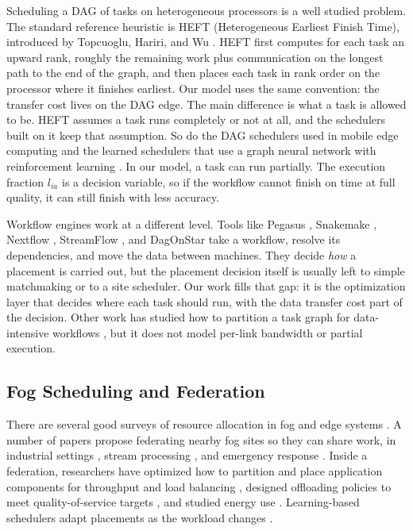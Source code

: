 \documentclass[conference]{IEEEtran}
\begin{document}
Scheduling a DAG of tasks on heterogeneous processors is a well studied problem. The standard reference heuristic is HEFT (Heterogeneous Earliest Finish Time), introduced by Topcuoglu, Hariri, and Wu \cite{topcuoglu2002heft}. HEFT first computes for each task an upward rank, roughly the remaining work plus communication on the longest path to the end of the graph, and then places each task in rank order on the processor where it finishes earliest. Our model uses the same convention: the transfer cost lives on the DAG edge. The main difference is what a task is allowed to be. HEFT assumes a task runs completely or not at all, and the schedulers built on it keep that assumption. So do the DAG schedulers used in mobile edge computing \cite{li2023dagmec} and the learned schedulers that use a graph neural network with reinforcement learning \cite{sharma2025grapheonrl}. In our model, a task can run partially. The execution fraction $l_{ia}$ is a decision variable, so if the workflow cannot finish on time at full quality, it can still finish with less accuracy.

Workflow engines work at a different level. Tools like Pegasus \cite{deelman2015pegasus,tanaka2022pegasusedge}, Snakemake \cite{koster2012snakemake}, Nextflow \cite{ditommaso2017nextflow}, StreamFlow \cite{colonnelli2021streamflow}, and DagOnStar \cite{sanchezgallegos2021dagonstar,perrotta2025streaming} take a workflow, resolve its dependencies, and move the data between machines. They decide \emph{how} a placement is carried out, but the placement decision itself is usually left to simple matchmaking or to a site scheduler. Our work fills that gap: it is the optimization layer that decides where each task should run, with the data transfer cost part of the decision. Other work has studied how to partition a task graph for data-intensive workflows \cite{ahmad2014workflow}, but it does not model per-link bandwidth or partial execution.

\subsection{Fog Scheduling and Federation}

There are several good surveys of resource allocation in fog and edge systems \cite{xu2021task,vevergara2023survey,hong2019survey,mouradian2018fog}. A number of papers propose federating nearby fog sites so they can share work, in industrial settings \cite{fgcs2024}, stream processing \cite{baccarelli2019ecomobifog}, and emergency response \cite{chiou2022emergency,gao2023lowlatency,kabanov2022}. Inside a federation, researchers have optimized how to partition and place application components for throughput \cite{faticanti2020partitioning} and load balancing \cite{faticanti2020load}, designed offloading policies to meet quality-of-service targets \cite{russo2024qos}, and studied energy use \cite{perin2022sustainable}. Learning-based schedulers adapt placements as the workload changes \cite{mao2017survey,min2019learning,wang2019deep}.
\end{document}
